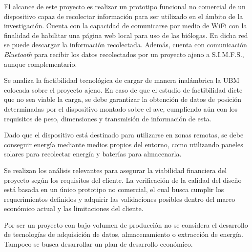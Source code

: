 El alcance de este proyecto es realizar un prototipo funcional no comercial de un dispositivo capaz de recolectar información para ser utilizado en el ámbito de la investigación. Cuenta con la capacidad de comunicarse por medio de WiFi con la finalidad de habilitar una página web local para uso de las biólogas. En dicha red se puede descargar la información recolectada. Además, cuenta con comunicación \textit{Bluetooth} para recibir los datos recolectados por un proyecto ajeno a S.I.M.F.S., aunque complementario.

Se analiza la factibilidad tecnológica de cargar de manera inalámbrica la UBM colocada sobre el proyecto ajeno. En caso de que el estudio de factibilidad dicte que no sea viable la carga, se debe garantizar la obtención de datos de posición determinadas por el dispositivo montado sobre el ave, cumpliendo aún con los requisitos de peso, dimensiones y transmisión de información de esta.


Dado que el dispositivo está destinado para utilizarse en zonas remotas, se debe conseguir energía mediante medios propios del entorno, como utilizando paneles solares para recolectar energía y baterías para almacenarla.

Se realizan los análisis relevantes para asegurar la viabilidad financiera del proyecto según los requisitos del cliente. La verificación de la calidad del diseño está basada en un único prototipo no comercial, el cual busca cumplir los requerimientos definidos y adquirir las validaciones posibles dentro del marco económico actual y las limitaciones del cliente. 

Por ser un proyecto con bajo volumen de producción no se considera el desarrollo de tecnologías de adquisición de datos, almacenamiento o extracción de energía. Tampoco se busca desarrollar un plan de desarrollo económico.